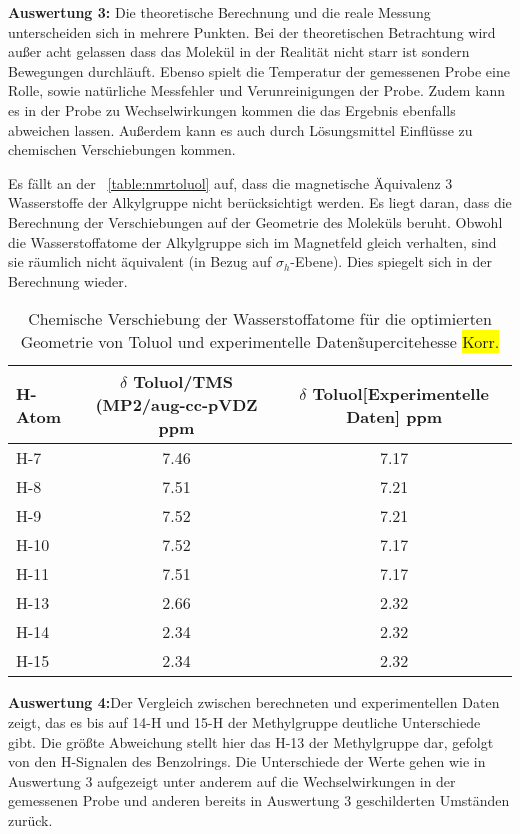 \documentclass[12pt]{article}
\begin{document}
\begin{onehalfspace}
\textbf{Auswertung 3:}
Die theoretische Berechnung und die reale Messung unterscheiden sich in mehrere Punkten.
 Bei der theoretischen Betrachtung wird außer acht gelassen dass das Molekül in der Realität
 nicht starr ist sondern Bewegungen durchläuft.
 Ebenso spielt die Temperatur der gemessenen Probe eine Rolle,
 sowie natürliche Messfehler und Verunreinigungen der Probe.
 Zudem kann es in der Probe zu Wechselwirkungen kommen die das Ergebnis ebenfalls abweichen lassen. Außerdem kann es auch durch Lösungsmittel Einflüsse zu chemischen Verschiebungen kommen.

Es fällt an der ~\ref{table:nmrtoluol} auf, dass die magnetische Äquivalenz
3 Wasserstoffe der Alkylgruppe nicht berücksichtigt werden. Es liegt daran,
dass die Berechnung der Verschiebungen auf der Geometrie des Moleküls beruht. Obwohl die Wasserstoffatome der Alkylgruppe sich im Magnetfeld gleich verhalten,
sind sie räumlich nicht äquivalent (in Bezug auf $\sigma _h$-Ebene). Dies spiegelt sich in der Berechnung wieder.


\begin{table}[!htpb]
  \caption{Chemische Verschiebung der Wasserstoffatome für die optimierten Geometrie von Toluol und experimentelle Daten\~supercite{hesse} \colorbox{yellow}{Korr.} }

\begin{tabular}{lcc}
\toprule
H-Atom  & \parbox[t]{4cm}{$\delta$ Toluol/TMS \\ (MP2/aug-cc-pVDZ\\ ppm}  &  \parbox[t]{4cm}{$\delta$ Toluol[Experimentelle Daten] \supercite{zeeh} ppm}\\
\midrule
H-7  & 7.46 & 7.17  \\
H-8  & 7.51 & 7.21   \\
H-9  &  7.52 & 7.21   \\
H-10 & 7.52 & 7.17 \\
H-11 & 7.51 & 7.17  \\
H-13 & 2.66 & 2.32  \\
H-14 & 2.34 & 2.32 \\
H-15 & 2.34 & 2.32  \\
\bottomrule
\end{tabular}
\end{table}
\pagebreak
\textbf{Auswertung 4:}Der Vergleich zwischen berechneten und experimentellen Daten zeigt, das  es bis auf 14-H und 15-H der Methylgruppe deutliche Unterschiede gibt. Die größte Abweichung stellt hier das H-13 der Methylgruppe dar, gefolgt von den H-Signalen des Benzolrings. Die Unterschiede der Werte gehen wie in Auswertung 3 aufgezeigt unter anderem auf die Wechselwirkungen in der gemessenen Probe und anderen bereits in Auswertung 3 geschilderten Umständen zurück.




\end{onehalfspace}
\end{document}
